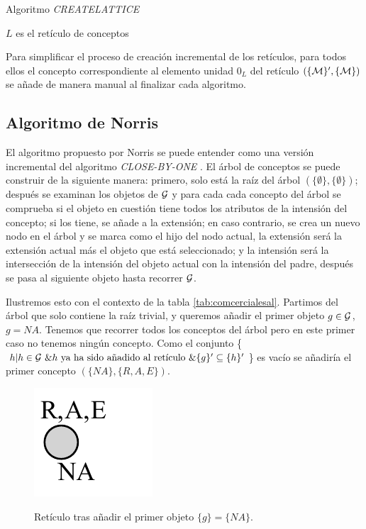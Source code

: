 \documentclass[oneside,openright,titlepage,numbers=noenddot,openany,headinclude,footinclude=true,
cleardoublepage=empty,abstractoff,BCOR=5mm,paper=a4,fontsize=12pt,main=spanish]{scrreprt}
\begin{document}
\begin{algorithm}[H]
\caption{Algoritmo \textit{CREATELATTICE}}
\label{code:createlattice}
     
     
     $L$ es el retículo de conceptos
\end{algorithm}

Para simplificar el proceso de creación incremental de los retículos, para todos ellos el concepto correspondiente al elemento unidad \textbf{$0$}$_L$ del retículo $(\{\mathcal{M}\}',\{\mathcal{M}\})$ se añade de manera manual al finalizar cada algoritmo.


\subsection{Algoritmo de Norris}
\label{alg:norris}


El algoritmo propuesto por Norris \cite{norris_algorithm_1978} se puede entender como una versión incremental del algoritmo \textit{CLOSE-BY-ONE} \cite{close-by-one}. El árbol de conceptos se puede construir de la siguiente manera: primero, solo está la raíz del árbol $(\{\emptyset\},\{\emptyset\})$; después se examinan los objetos de $\mathcal{G}$ y para cada cada concepto del árbol se comprueba si el objeto en cuestión tiene todos los atributos de la intensión del concepto; si los tiene, se añade a la extensión; en caso contrario, se crea un nuevo nodo en el árbol y se marca como el hijo del nodo actual, la extensión será la extensión actual más el objeto que está seleccionado; y la intensión será la intersección de la intensión del objeto actual con la intensión del padre, después se pasa al siguiente objeto hasta recorrer $\mathcal{G}$.

Ilustremos esto con el contexto de la tabla \ref{tab:comcercialesal}. Partimos del árbol que solo contiene la raíz trivial, y queremos añadir el primer objeto $g \in \mathcal{G}$, $g=NA$. Tenemos que recorrer todos los conceptos del árbol pero en este primer caso no tenemos ningún concepto. Como el conjunto \{$h | h\in \mathcal{G}  \ \&  h \text{ ya ha sido añadido al retículo} \ \& \{g\}'\subseteq \{h\}'$\} es vacío se añadiría el primer concepto $(\{NA\},\{R,A,E\})$. 

\begin{figure}[H]
  \centering
  \includegraphics[scale=0.7]{images/paso1norris.pdf}
  \label{fig:test2}
\caption{Retículo tras añadir el primer objeto $\{g\}=\{NA\}$.}
\end{figure}
\end{document}
